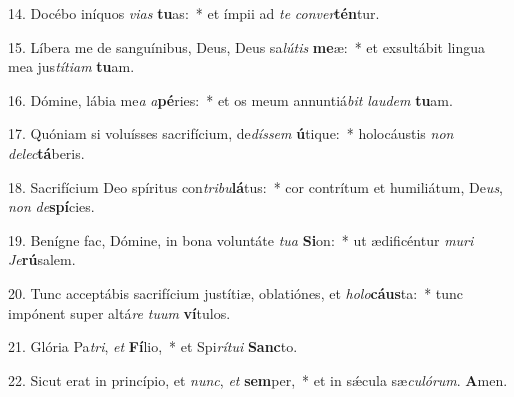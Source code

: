 14. Docébo iníquos \textit{vi}\textit{as} \textbf{tu}as:~* et ímpii ad \textit{te} \textit{con}\textit{ver}\textbf{tén}tur.

15. Líbera me de sanguínibus, Deus, Deus sa\textit{lú}\textit{tis} \textbf{me}æ:~* et exsultábit lingua mea jus\textit{tí}\textit{ti}\textit{am} \textbf{tu}am.

16. Dómine, lábia me\textit{a} \textit{a}\textbf{pé}ries:~* et os meum annuntiá\textit{bit} \textit{lau}\textit{dem} \textbf{tu}am.

17. Quóniam si voluísses sacrifícium, de\textit{dís}\textit{sem} \textbf{ú}tique:~* holocáustis \textit{non} \textit{de}\textit{lec}\textbf{tá}beris.

18. Sacrifícium Deo spíritus con\textit{tri}\textit{bu}\textbf{lá}tus:~* cor contrítum et humiliátum, De\textit{us}, \textit{non} \textit{de}\textbf{spí}cies.

19. Benígne fac, Dómine, in bona voluntáte \textit{tu}\textit{a} \textbf{Si}on:~* ut ædificéntur \textit{mu}\textit{ri} \textit{Je}\textbf{rú}salem.

20. Tunc acceptábis sacrifícium justítiæ, oblatiónes, et \textit{ho}\textit{lo}\textbf{cáus}ta:~* tunc impónent super altá\textit{re} \textit{tu}\textit{um} \textbf{ví}tulos.

21. Glória Pa\textit{tri}, \textit{et} \textbf{Fí}lio,~* et Spi\textit{rí}\textit{tu}\textit{i} \textbf{Sanc}to.

22. Sicut erat in princípio, et \textit{nunc}, \textit{et} \textbf{sem}per,~* et in sǽcula sæ\textit{cu}\textit{ló}\textit{rum}. \textbf{A}men.